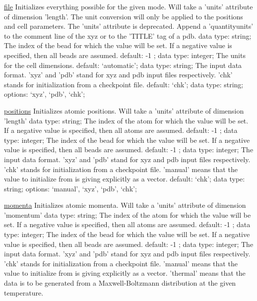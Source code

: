\begin{ipifield}{}
\begin{ipifield}{\hyperref[INITFILE]{file}}
{Initializes everything possible for the given mode. Will take a 'units' attribute of dimension 'length'. The unit conversion will only be applied to the positions and cell parameters. The 'units' attribute is deprecated. Append a 'quantity{units}' to the comment line of the xyz or to the 'TITLE' tag of a pdb.}%
{data type: string; }%
{%
{The index of the bead for which the value will be set. If a negative value is specified, then all beads are assumed.}%
{default:  -1 ; data type: integer; }%
%
{The units for the cell dimensions.}%
{default: `automatic'; data type: string; }%
%
{The input data format. 'xyz' and 'pdb' stand for xyz and pdb input files respectively. 'chk' stands for initialization from a checkpoint file.}%
{default: `chk'; data type: string; options: `xyz', `pdb', `chk'; }%
}
\end{ipifield}
\begin{ipifield}{\hyperref[INITPOSITIONS]{positions}}%
{Initializes atomic positions. Will take a 'units' attribute of dimension 'length'}%
{data type: string; }%
{%
{The index of the atom for which the value will be set. If a negative value is specified, then all atoms are assumed.}%
{default:  -1 ; data type: integer; }%
%
{The index of the bead for which the value will be set. If a negative value is specified, then all beads are assumed.}%
{default:  -1 ; data type: integer; }%
%
{The input data format. 'xyz' and 'pdb' stand for xyz and pdb input files respectively. 'chk' stands for initialization from a checkpoint file. 'manual' means that the value to initialize from is giving explicitly as a vector.}%
{default: `chk'; data type: string; options: `manual', `xyz', `pdb', `chk'; }%
}
\end{ipifield}
\begin{ipifield}{\hyperref[INITMOMENTA]{momenta}}%
{Initializes atomic momenta. Will take a 'units' attribute of dimension 'momentum'}%
{data type: string; }%
{%
{The index of the atom for which the value will be set. If a negative value is specified, then all atoms are assumed.}%
{default:  -1 ; data type: integer; }%
%
{The index of the bead for which the value will be set. If a negative value is specified, then all beads are assumed.}%
{default:  -1 ; data type: integer; }%
%
{The input data format. 'xyz' and 'pdb' stand for xyz and pdb input files respectively. 'chk' stands for initialization from a checkpoint file. 'manual' means that the value to initialize from is giving explicitly as a vector. 'thermal' means that the data is to be generated from a Maxwell-Boltzmann distribution at the given temperature.}%
}
\end{ipifield}
\end{ipifield}
